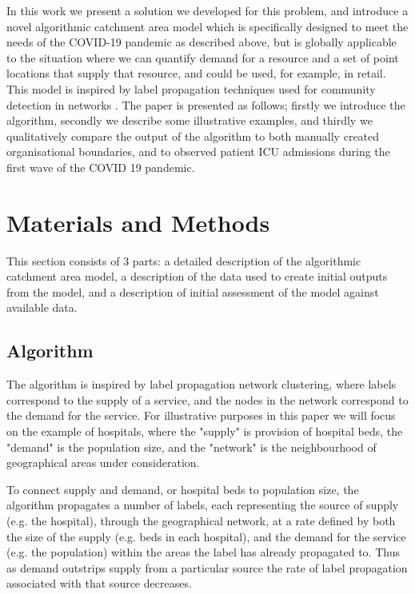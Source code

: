 \documentclass[twocolumn]{bmcart}%
\begin{document}
In this work we present a solution we developed for this problem, and introduce a novel algorithmic catchment area 
model which is specifically designed to meet the needs of the COVID-19 pandemic as described above, but is globally 
applicable to the situation where we can quantify demand for a resource and a set of point locations that supply that 
resource, and could be used, for example, in retail. This model is inspired by label propagation techniques used for 
community detection in networks 
\cite{fortunatoCommunityDetectionNetworks2016,xieCommunityDetectionUsing2011,xieLabelRankStabilizedLabel2013}. The 
paper is presented as follows; firstly we introduce the algorithm, secondly we describe some illustrative examples, and 
thirdly we qualitatively compare the output of the algorithm to both manually created organisational boundaries, and to 
observed patient ICU admissions during the first wave of the COVID 19 pandemic.

\section*{Materials and Methods}

This section consists of 3 parts: a detailed description of the algorithmic catchment area model, a description of the 
data used to create initial outputs from the model, and a description of initial assessment of the model against 
available data.

\subsection*{Algorithm}

The algorithm is inspired by label propagation network clustering, where labels correspond to the supply of a service, 
and the nodes in the network correspond to the demand for the service. For illustrative purposes in this paper we will 
focus on the example of hospitals, where the "supply" is provision of hospital beds, the "demand" is the population 
size, and the "network" is the neighbourhood of geographical areas under consideration. 

To connect supply and demand, or hospital beds to population size, the algorithm propagates a number of labels, each 
representing the source of supply (e.g. the hospital), through the geographical network, at a rate defined by both the 
size of the supply (e.g. beds in each hospital), and the demand for the service (e.g. the population) within the areas 
the label has already propagated to. Thus as demand outstrips supply from a particular source the rate of label 
propagation associated with that source decreases.
\end{document}
